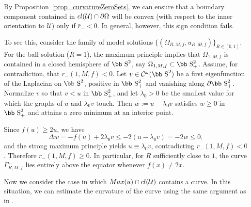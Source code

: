 \documentclass[11pt]{article}
\def\s{\hbox{\bb S}}
\newcommand{\U}{\mathcal{U}}
\numberwithin{equation} {section}
\begin{document}
\begin{remark}\label{remarkSignOfR1}
By Proposition~\ref{prop_curvatureZeroSets}, we can ensure that a boundary component contained in $\textup{cl}(\mathcal{U})\cap\partial\Omega$ will be convex (with respect to the inner orientation to $\mathcal{U}$) only if $\bar r_-<0$.
In general, however, this sign condition fails.

To see this, consider the family of model solutions $\{(\Omega_{R,M,f},u_{R,M,f})\}_{R\in[0,1]}$. For the ball solution ($R=1$), the maximum principle implies that $\Omega_{1,M,f}$ is contained in a closed hemisphere of $\s^2$, say $\Omega_{1,M,f}\subset \s^2_+$.
Assume, for contradiction, that $r_-(1,M,f)<0$.
Let $v\in\mathcal{C}^{\omega}(\s^2)$ be a first eigenfunction of the Laplacian on $\s^2$, positive in $\s^2_+$ and vanishing along $\partial\s^2_+$.
Normalize $v$ so that $v<u$ in $\s^2_+$, and let $\lambda_0>0$ be the smallest value for which the graphs of $u$ and $\lambda_0 v$ touch.
Then $w:=u-\lambda_0 v$ satisfies $w\ge 0$ in $\s^2_+$ and attains a zero minimum at an interior point.

Since $f(u)\ge 2u$, we have
\[
\Delta w=-f(u)+2\lambda_0 v \le -2(u-\lambda_0 v)=-2w\le 0,
\]
and the strong maximum principle yields $u\equiv \lambda_0 v$, contradicting $r_-(1,M,f)<0$.
Therefore $r_-(1,M,f)\ge 0$.
In particular, for $R$ sufficiently close to $1$, the curve $\Gamma_{R,M,f}^-$ lies entirely above the equator whenever $f(x)\neq 2x$.
\end{remark}

Now we consider the case in which $\textup{Max} (u) \cap \textup{cl}(\U)$ contains a curve. In this situation, we can estimate the curvature of the curve using the same argument as in \cite[Proposition 4.2]{EMa}.
\end{document}
